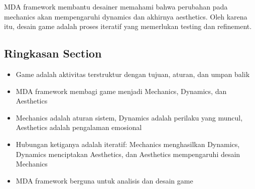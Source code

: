 \begin{catatan}
MDA framework membantu desainer memahami bahwa perubahan pada mechanics akan mempengaruhi dynamics dan akhirnya aesthetics. Oleh karena itu, desain game adalah proses iteratif yang memerlukan testing dan refinement.
\end{catatan}

\subsection{Ringkasan Section}

\begin{itemize}
\item Game adalah aktivitas terstruktur dengan tujuan, aturan, dan umpan balik
\item MDA framework membagi game menjadi Mechanics, Dynamics, dan Aesthetics
\item Mechanics adalah aturan sistem, Dynamics adalah perilaku yang muncul, Aesthetics adalah pengalaman emosional
\item Hubungan ketiganya adalah iteratif: Mechanics menghasilkan Dynamics, Dynamics menciptakan Aesthetics, dan Aesthetics mempengaruhi desain Mechanics
\item MDA framework berguna untuk analisis dan desain game
\end{itemize}
